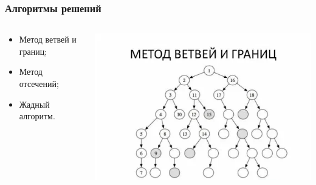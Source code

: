 \documentclass[12pt]{beamer}
\begin{document}
    \begin{frame}
        \frametitle{Алгоритмы решений}
    
        \begin{columns}
            \begin{column}{0.5\textwidth}
                \begin{itemize}
                    \item Метод ветвей и границ;
                    \item Метод отсечений;
                    \item Жадный алгоритм.
                \end{itemize}
            \end{column}
            \begin{column}{0.5\textwidth}
                \includegraphics[width=1\textwidth]{vetvi.png}
            \end{column}
        \end{columns}
    
    \end{frame}
\end{document}
